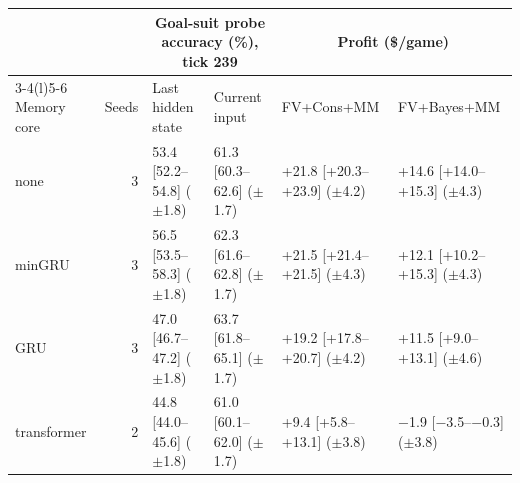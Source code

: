  \begin{tabular}{@{}lrllll@{}}
    \toprule
    & & \multicolumn{2}{c}{Goal-suit probe accuracy (\%), tick 239} & \multicolumn{2}{c}{Profit (\$/game)} \\
    \cmidrule(lr){3-4}\cmidrule(l){5-6}
    Memory core & Seeds & Last hidden state & Current input & FV+Cons+MM & FV+Bayes+MM \\
    \midrule
    none & 3 & 53.4 [52.2--54.8] ($\pm$1.8) & 61.3 [60.3--62.6] ($\pm$1.7) & +21.8 [+20.3--+23.9] ($\pm$4.2) & +14.6 [+14.0--+15.3] ($\pm$4.3) \\
    minGRU & 3 & 56.5 [53.5--58.3] ($\pm$1.8) & 62.3 [61.6--62.8] ($\pm$1.7) & +21.5 [+21.4--+21.5] ($\pm$4.3) & +12.1 [+10.2--+15.3] ($\pm$4.3) \\
    GRU & 3 & 47.0 [46.7--47.2] ($\pm$1.8) & 63.7 [61.8--65.1] ($\pm$1.7) & +19.2 [+17.8--+20.7] ($\pm$4.2) & +11.5 [+9.0--+13.1] ($\pm$4.6) \\
    transformer & 2 & 44.8 [44.0--45.6] ($\pm$1.8) & 61.0 [60.1--62.0] ($\pm$1.7) & +9.4 [+5.8--+13.1] ($\pm$3.8) & $-$1.9 [$-$3.5--$-$0.3] ($\pm$3.8) \\
    \bottomrule
  \end{tabular}
